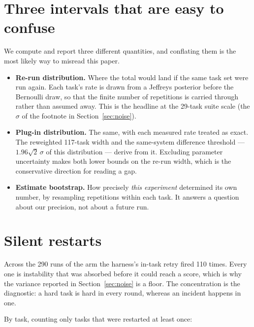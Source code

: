 \section{Three intervals that are easy to confuse}
\label{app:intervals}
We compute and report three different quantities, and conflating them is the
most likely way to misread this paper.
\begin{itemize}\itemsep2pt
\item \textbf{Re-run distribution.} Where the total would land if the same task
  set were run again. Each task's rate is drawn from a Jeffreys posterior
  before the Bernoulli draw, so that the finite number of repetitions is
  carried through rather than assumed away. This is the headline at the 29-task
  suite scale (the $\sigma$ of the footnote in Section~\ref{sec:noise}).
\item \textbf{Plug-in distribution.} The same, with each measured rate treated
  as exact. The reweighted 117-task width and the same-system difference threshold ---
  $1.96\sqrt{2}\,\sigma$ of this distribution --- derive from it. Excluding
  parameter uncertainty makes both lower bounds on the re-run width, which is
  the conservative direction for reading a gap.
\item \textbf{Estimate bootstrap.} How precisely \emph{this experiment}
  determined its own number, by resampling repetitions within each task. It
  answers a question about our precision, not about a future run.
\end{itemize}

\section{Silent restarts}
\label{app:retries}
Across the 290 runs of the arm the harness's in-task retry fired 110 times.
Every one is instability that was absorbed before it could reach a score, which
is why the variance reported in Section~\ref{sec:noise} is a floor. The
concentration is the diagnostic: a hard task is hard in every round, whereas an
incident happens in one.

\begin{center}\small

\end{center}

\noindent By task, counting only tasks that were restarted at least once:

\begin{center}\scriptsize

\end{center}

